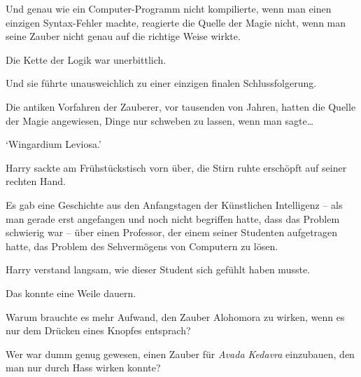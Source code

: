 Und genau wie ein Computer-Programm nicht kompilierte, wenn man einen einzigen Syntax-Fehler machte, reagierte die Quelle der Magie nicht, wenn man seine Zauber nicht genau auf die richtige Weise wirkte.

Die Kette der Logik war unerbittlich.

Und sie führte unausweichlich zu einer einzigen finalen Schlussfolgerung.

Die antiken Vorfahren der Zauberer, vor tausenden von Jahren, hatten die Quelle der Magie angewiesen, Dinge nur schweben zu lassen, wenn man sagte…

‘Wingardium Leviosa.’

Harry sackte am Frühstückstisch vorn über, die Stirn ruhte erschöpft auf seiner rechten Hand.

Es gab eine Geschichte aus den Anfangstagen der Künstlichen Intelligenz -- als man gerade erst angefangen und noch nicht begriffen hatte, dass das Problem schwierig war -- über einen Professor, der einem seiner Studenten aufgetragen hatte, das Problem des Sehvermögens von Computern zu lösen.

Harry verstand langsam, wie dieser Student sich gefühlt haben musste.

Das konnte eine Weile dauern.

Warum brauchte es mehr Aufwand, den Zauber Alohomora zu wirken, wenn es nur dem Drücken eines Knopfes entsprach?

Wer war dumm genug gewesen, einen Zauber für \emph{Avada Kedavra} einzubauen, den man nur durch Hass wirken konnte?

